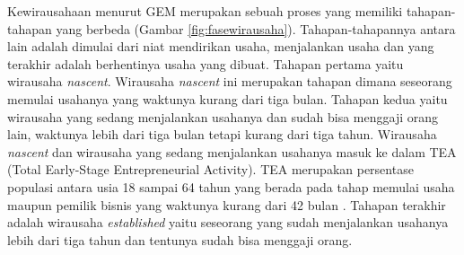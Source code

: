 Kewirausahaan menurut GEM merupakan sebuah proses yang memiliki tahapan-tahapan yang berbeda (Gambar \ref{fig:fasewirausaha}). Tahapan-tahapannya antara lain adalah dimulai dari niat mendirikan usaha, menjalankan usaha dan yang terakhir adalah berhentinya usaha yang dibuat. Tahapan pertama yaitu wirausaha \textit{nascent}. Wirausaha \textit{nascent} ini merupakan tahapan dimana seseorang memulai usahanya yang waktunya kurang dari tiga bulan. Tahapan kedua yaitu wirausaha yang sedang menjalankan usahanya dan sudah bisa menggaji orang lain, waktunya lebih dari tiga bulan tetapi kurang dari tiga tahun. Wirausaha \textit{nascent} dan wirausaha yang sedang menjalankan usahanya masuk ke dalam TEA (Total Early-Stage Entrepreneurial Activity). TEA merupakan persentase populasi antara usia 18 sampai 64 tahun yang berada pada tahap memulai usaha maupun pemilik bisnis yang waktunya kurang dari 42 bulan \cite{wirausahaGEM}. Tahapan terakhir adalah wirausaha \textit{established} yaitu seseorang yang sudah menjalankan usahanya lebih dari tiga tahun dan tentunya sudah bisa menggaji orang.\cite{GEM2013}

